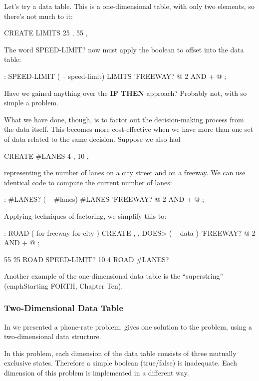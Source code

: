 Let's try a data table. This is a one-dimensional table, with only two
elements, so there's not much to it:

\begin{Code}
CREATE LIMITS   25 ,  55 ,
\end{Code}
The word SPEED-LIMIT? now must apply the boolean to offset into
the data table:

\begin{Code}
: SPEED-LIMIT  ( -- speed-limit)
     LIMITS  'FREEWAY? @  2 AND  +  @ ;
\end{Code}
Have we gained anything over the \textbf{IF THEN} approach? Probably not,
with so simple a problem.

What we have done, though, is to factor out the decision-making
process from the data itself. This becomes more cost-effective when we
have more than one set of data related to the same decision. Suppose we
also had

\begin{Code}
CREATE #LANES   4 ,  10 ,
\end{Code}
representing the number of lanes on a city street and on a freeway. We
can use identical code to compute the current number of lanes:

\begin{Code}
: #LANES?  ( -- #lanes)
     #LANES  'FREEWAY? @  2 AND  +  @ ;
\end{Code}
Applying techniques of factoring, we simplify this to:

\begin{Code}
: ROAD  ( for-freeway for-city ) CREATE , ,
     DOES> ( -- data )  'FREEWAY? @  2 AND  +  @ ;

55 25 ROAD SPEED-LIMIT?
10  4 ROAD #LANES?
\end{Code}
Another example of the one-dimensional data table is the ``superstring''
(emph{Starting FORTH}, Chapter Ten).

\subsubsection{Two-Dimensional Data Table}
In  we presented a phone-rate problem.  gives one
solution to the problem, using a two-dimensional data structure.

In this problem, each dimension of the data table consists of three
mutually exclusive states. Therefore a simple boolean (true/false) is
inadequate. Each dimension of this problem is implemented in a different
way.

